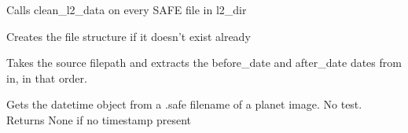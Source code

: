 \documentclass[letterpaper,10pt,english]{sphinxmanual}
\begin{document}
\begin{fulllineitems}
\label{\detokenize{index:pyeo.filesystem_utilities.clean_l2_dir}}
Calls clean\_l2\_data on every SAFE file in l2\_dir

\end{fulllineitems}


\begin{fulllineitems}
\label{\detokenize{index:pyeo.filesystem_utilities.create_file_structure}}
Creates the file structure if it doesn’t exist already

\end{fulllineitems}


\begin{fulllineitems}
\label{\detokenize{index:pyeo.filesystem_utilities.get_change_detection_dates}}
Takes the source filepath and extracts the before\_date and after\_date dates from in, in that order.

\end{fulllineitems}


\begin{fulllineitems}
\label{\detokenize{index:pyeo.filesystem_utilities.get_image_acquisition_time}}
Gets the datetime object from a .safe filename of a planet image. No test. Returns None if no timestamp present

\end{fulllineitems}
\end{document}
